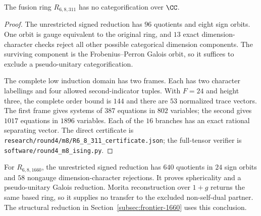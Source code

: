 \begin{theorem}
\label{thm:round4-311}
The fusion ring $R_{6,8,311}$ has no categorification over $\CC$.
\end{theorem}
\begin{proof}
The unrestricted signed reduction has $96$ quotients and eight sign
orbits.  One orbit is gauge equivalent to the original ring, and $13$
exact dimension-character checks reject all other possible categorical
dimension components.  The surviving component is the
Frobenius--Perron Galois orbit, so it suffices to exclude a
pseudo-unitary categorification.

The complete low induction domain has two frames.  Each has two
character labellings and four allowed second-indicator tuples.  With
$F=24$ and height three, the complete order bound is $144$ and there are
$53$ normalized trace vectors.  The first frame gives systems of $387$
equations in $802$ variables; the second gives $1017$ equations in
$1896$ variables.  Each of the $16$ branches has an exact rational
separating vector.  The direct certificate is
\texttt{research/round4/m8/R6\_8\_311\_certificate.json}; the
full-tensor verifier is
\texttt{software/round4\_m8\_ising.py}.
\end{proof}

For $R_{6,8,1660}$, the unrestricted signed reduction has $640$
quotients in $24$ sign orbits and $58$ nongauge dimension-character
rejections. It proves sphericality and a pseudo-unitary Galois reduction.
Morita reconstruction over $1+g$ returns the same based ring, so it
supplies no transfer to the excluded non-self-dual partner. The structural reduction in Section~\ref{subsec:frontier-1660}
uses this conclusion.

